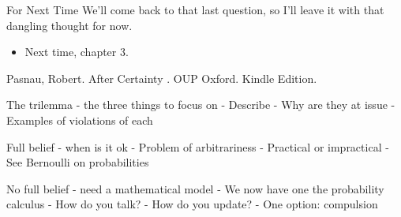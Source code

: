 \documentclass[
  17pt,
  letterpaper,
  ignorenonframetext,
  aspectratio=169,
]{beamer}
\providecommand{\tightlist}{%
  \setlength{\itemsep}{0pt}\setlength{\parskip}{0pt}}\usepackage{longtable,booktabs,array}
\begin{document}
\begin{frame}{For Next Time}
\protect\hypertarget{for-next-time}{}
We'll come back to that last question, so I'll leave it with that
dangling thought for now.

\begin{itemize}[<+->]
\tightlist
\item
  Next time, chapter 3.
\end{itemize}

Pasnau, Robert. After Certainty . OUP Oxford. Kindle Edition.

The trilemma - the three things to focus on - Describe - Why are they at
issue - Examples of violations of each

Full belief - when is it ok - Problem of arbitrariness - Practical or
impractical - See Bernoulli on probabilities

No full belief - need a mathematical model - We now have one the
probability calculus - How do you talk? - How do you update? - One
option: compulsion
\end{frame}
\end{document}
